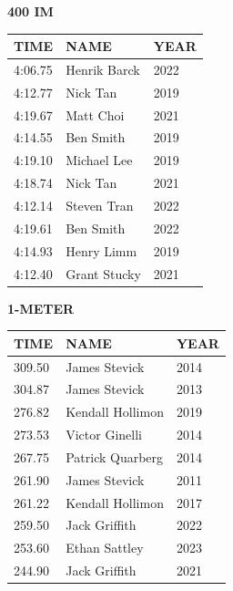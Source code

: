 \begin{table}[H]
\centering
\begin{minipage}[t]{0.6\textwidth}
\centering
\textbf{400 IM}\\[0.1cm]
\begin{tabular}{@{}p{1.8cm}p{2.8cm}p{1.2cm}@{}}
\hline
    \textbf{TIME} & \textbf{NAME} & \textbf{YEAR} \\
\hline
    4:06.75 & Henrik Barck & 2022 \\
    4:12.77 & Nick Tan & 2019 \\
    4:19.67 & Matt Choi & 2021 \\
    4:14.55 & Ben Smith & 2019 \\
    4:19.10 & Michael Lee & 2019 \\
    4:18.74 & Nick Tan & 2021 \\
    4:12.14 & Steven Tran & 2022 \\
    4:19.61 & Ben Smith & 2022 \\
    4:14.93 & Henry Limm & 2019 \\
    4:12.40 & Grant Stucky & 2021 \\
\hline
\end{tabular}
\end{minipage}
\end{table}

\begin{table}[H]
\centering
\begin{minipage}[t]{0.6\textwidth}
\centering
\textbf{1-METER}\\[0.1cm]
\begin{tabular}{@{}p{1.8cm}p{2.8cm}p{1.2cm}@{}}
\hline
    \textbf{TIME} & \textbf{NAME} & \textbf{YEAR} \\
\hline
    309.50 & James Stevick & 2014 \\
    304.87 & James Stevick & 2013 \\
    276.82 & Kendall Hollimon & 2019 \\
    273.53 & Victor Ginelli & 2014 \\
    267.75 & Patrick Quarberg & 2014 \\
    261.90 & James Stevick & 2011 \\
    261.22 & Kendall Hollimon & 2017 \\
    259.50 & Jack Griffith & 2022 \\
    253.60 & Ethan Sattley & 2023 \\
    244.90 & Jack Griffith & 2021 \\
\hline
\end{tabular}
\end{minipage}
\end{table}

